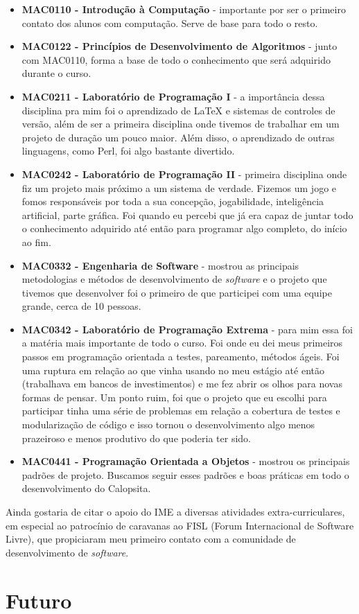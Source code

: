 \documentclass[titlepage,a4paper]{article}
\newcommand{\software}{\textit{software}}
\newcommand{\calopsita}{Calopsita}
\begin{document}
\begin{itemize}
	\item{\textbf{MAC0110 - Introdução à Computação} - importante por ser o primeiro contato dos alunos com computação. Serve de base para todo o resto.}
	\item{\textbf{MAC0122 - Princípios de Desenvolvimento de Algoritmos} - junto com MAC0110, forma a base de todo o conhecimento que será adquirido durante o curso.}
	\item{\textbf{MAC0211 - Laboratório de Programação I} - a importância dessa disciplina pra mim foi o aprendizado de LaTeX e sistemas de controles de versão, além de ser a primeira disciplina onde tivemos de trabalhar em um projeto de duração um pouco maior. Além disso, o aprendizado de outras linguagens, como Perl, foi algo bastante divertido.}
	\item{\textbf{MAC0242 - Laboratório de Programação II} - primeira disciplina onde fiz um projeto mais próximo a um sistema de verdade. Fizemos um jogo e fomos responsáveis por toda a sua concepção, jogabilidade, inteligência artificial, parte gráfica. Foi quando eu percebi que já era capaz de juntar todo o conhecimento adquirido até então para programar algo completo, do início ao fim.}
	\item{\textbf{MAC0332 - Engenharia de Software} - mostrou as principais metodologias e métodos de desenvolvimento de \software{} e o projeto que tivemos que desenvolver  foi o primeiro de que participei com uma equipe grande, cerca de 10 pessoas.}
	\item{\textbf{MAC0342 - Laboratório de Programação Extrema} - para mim essa foi a matéria mais importante de todo o curso. Foi onde eu dei meus primeiros passos em programação orientada a testes, pareamento, métodos ágeis. Foi uma ruptura em relação ao que vinha usando no meu estágio até então (trabalhava em bancos de investimentos) e me fez abrir os olhos para novas formas de pensar. Um ponto ruim, foi que o projeto que eu escolhi para participar tinha uma série de problemas em relação a cobertura de testes e modularização de código e isso tornou o desenvolvimento algo menos prazeiroso e menos produtivo do que poderia ter sido.}
	\item{\textbf{MAC0441 - Programação Orientada a Objetos} - mostrou os principais padrões de projeto. Buscamos seguir esses padrões e boas práticas em todo o desenvolvimento do \calopsita{}.}
\end{itemize}

Ainda gostaria de citar o apoio do IME a diversas atividades extra-curriculares, em especial ao patrocínio de caravanas ao FISL (Forum Internacional de Software Livre), que propiciaram meu primeiro contato com a comunidade de desenvolvimento de \software{}.

\section{Futuro}
\end{document}
